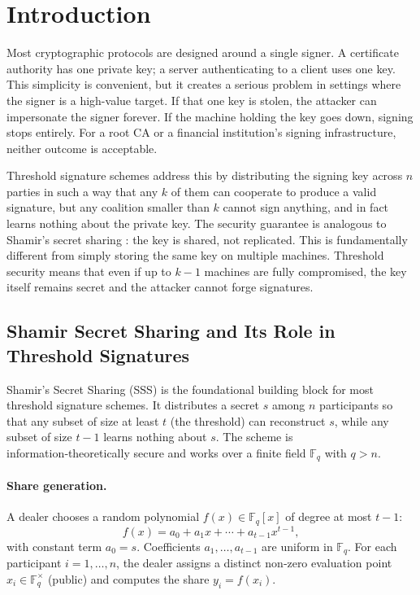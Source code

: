 \section{Introduction}
\label{sec:intro}

Most cryptographic protocols are designed around a single signer. A certificate authority
has one private key; a server authenticating to a client uses one key. This simplicity is
convenient, but it creates a serious problem in settings where the signer is a
high-value target. If that one key is stolen, the attacker can impersonate the signer
forever. If the machine holding the key goes down, signing stops entirely. For a root CA
or a financial institution's signing infrastructure, neither outcome is acceptable.

Threshold signature schemes address this by distributing the signing key across $n$
parties in such a way that any $k$ of them can cooperate to produce a valid signature,
but any coalition smaller than $k$ cannot sign anything, and in fact learns nothing about
the private key. The security guarantee is analogous to Shamir's secret sharing
\cite{Sha79}: the key is shared, not replicated. This is fundamentally different from
simply storing the same key on multiple machines. Threshold security means that even
if up to $k - 1$ machines are fully compromised, the key itself remains secret and the
attacker cannot forge signatures.

\subsection{Shamir Secret Sharing and Its Role in Threshold Signatures}
\label{subsec:sss}

Shamir's Secret Sharing (SSS) \cite{Sha79} is the foundational building block for most
threshold signature schemes. It distributes a secret $s$ among $n$ participants so that
any subset of size at least $t$ (the threshold) can reconstruct $s$, while any subset of
size $t-1$ learns nothing about $s$. The scheme is information‑theoretically secure and
works over a finite field $\mathbb{F}_q$ with $q > n$.

\paragraph{Share generation.}
A dealer chooses a random polynomial $f(x) \in \mathbb{F}_q[x]$ of degree at most $t-1$:
\[
f(x) = a_0 + a_1 x + \cdots + a_{t-1} x^{t-1},
\]
with constant term $a_0 = s$. Coefficients $a_1,\dots,a_{t-1}$ are uniform in $\mathbb{F}_q$.
For each participant $i = 1,\dots,n$, the dealer assigns a distinct non‑zero evaluation
point $x_i \in \mathbb{F}_q^\times$ (public) and computes the share $y_i = f(x_i)$.

